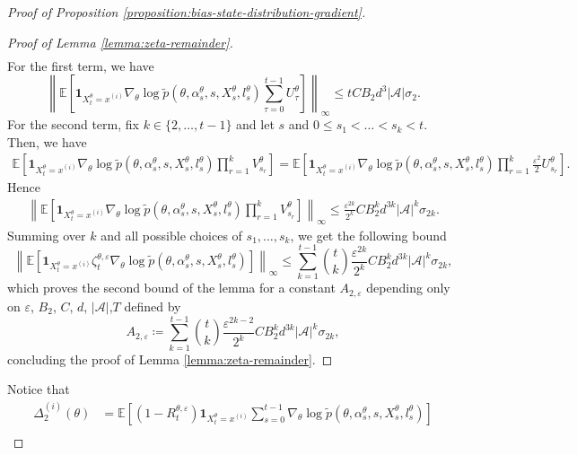 \documentclass[11pt]{article}
\numberwithin{equation}{section}
\theoremstyle{definition}
\theoremstyle{remark}
\def\eps{\varepsilon}
\def\cA{\mathcal{A}}
\begin{document}
\begin{proof}[Proof of Proposition \ref{proposition:bias-state-distribution-gradient}]
\begin{proof}[Proof of Lemma \ref{lemma:zeta-remainder}]
\[\begin{aligned}
    \end{aligned}
    \]
    For the first term, we have
    \[
    \left\|\mathbb E \left[\mathbf 1_{X_t^\theta = x^{(i)}} \nabla_\theta \log \tilde p (\theta, \alpha_s^{\theta},s, X_s^\theta, l_s^\theta)  \sum_{\tau=0}^{t-1} U_\tau^\theta \right] \right\|_\infty 
    \leq t C B_2 d^3 | \cA | \sigma_2.
    \]
    For the second term, fix $k \in \{2, \ldots, t-1\}$ and let $s$ and $0 \leq s_1 < \ldots < s_k < t$. Then, we have
   \[
   \begin{aligned}
    \mathbb E \left[ \mathbf 1_{X_t^\theta = x^{(i)}} \nabla_\theta \log \tilde p (\theta, \alpha_s^{\theta}, s,X_s^\theta, l_s^\theta) \prod_{r=1}^{k} V_{s_r}^\theta \right]
    = \mathbb E \left[ \mathbf 1_{X_t^\theta = x^{(i)}} \nabla_\theta \log \tilde p (\theta, \alpha_s^{\theta},s, X_s^\theta, l_s^\theta) \prod_{r=1}^{k} \frac{\eps^2}{2} U_{s_r}^\theta \right].
   \end{aligned}
   \] 
   Hence 
   \[
   \begin{aligned}
    \left\| \mathbb E \left[ \mathbf 1_{X_t^\theta = x^{(i)}} \nabla_\theta \log \tilde p (\theta, \alpha_s^{\theta},s, X_s^\theta, l_s^\theta) \prod_{r=1}^{k} V_{s_r}^\theta \right] \right\|_\infty 
    \leq \frac{\eps^{2k}}{2^k} C B_2^{k} d^{3k} | \cA |^k \sigma_{2k}.
   \end{aligned}
   \]
    Summing over $k$ and all possible choices of $s_1, \ldots, s_k$, we get the following bound
    \[
    \left\| \mathbb E \left[
    \mathbf 1_{X_t^\theta = x^{(i)}} \zeta_t^{\theta, \eps} \nabla_\theta \log \tilde p (\theta, \alpha_s^{\theta}, s,X_s^\theta, l_s^\theta)
    \right] \right\|_\infty 
    \leq  \sum_{k=1}^{t-1} \binom{t}{k} \frac{\eps^{2k}}{2^k} C B_2^{k} d^{3k} | \cA |^k \sigma_{2k},
    \]
    which proves the second bound of the lemma for a constant $A_{2,\eps}$ depending only on $\eps$, $B_2$, $C$, $d$, $| \cA |$,$T$ defined by
    \begin{equation}
        \label{eq:def-A2}
        A_{2, \eps} \coloneq \sum_{k=1}^{t-1} \binom{t}{k} \frac{\eps^{2k - 2}}{2^k} C B_2^{k} d^{3k} | \cA |^k \sigma_{2k},
    \end{equation}
    concluding the proof of Lemma \ref{lemma:zeta-remainder}.
\end{proof}
Notice that
\[
\begin{aligned}
\Delta_2^{(i)}(\theta) &= \mathbb E \left[ (1 - R^{\theta, \eps}_t)\mathbf 1_{X_t^\theta = x^{(i)}} \sum_{s=0}^{t-1} \nabla_\theta \log \tilde p (\theta, \alpha_s^{\theta}, s,X_s^\theta, l_s^\theta)  \right] \\

\end{aligned}\]
\end{proof}
\end{document}
